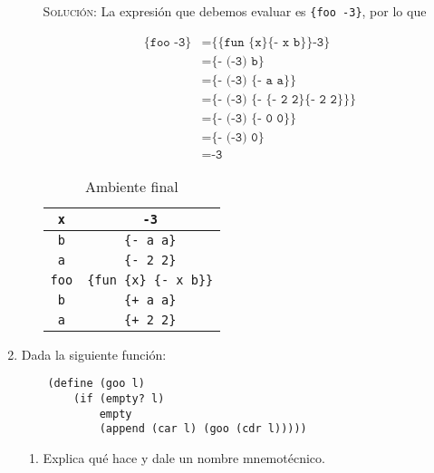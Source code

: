 \documentclass[letterpaper,11pt]{article}
\begin{document}
\begin{enumerate}
\begin{enumerate}
        \textsc{Solución:} La expresión que debemos evaluar es 
        \texttt{\{foo -3\}}, por lo que 
        \begin{table}[h]
            \parbox{.6\linewidth}{
            \centering
            \begin{align*}
                \texttt{\{foo -3\}}
                &= \texttt{\{\{fun \{x\} \{- x b\}\} -3\}} \\
                &= \texttt{\{- (-3) b\}} \\
                &= \texttt{\{- (-3) \{- a a\}\}} \\
                &= \texttt{\{- (-3) \{- \{- 2 2\} \{- 2 2\}\}\}} \\
                &= \texttt{\{- (-3) \{- 0 0\}\}} \\
                &= \texttt{\{- (-3) 0\}} \\
                &= \texttt{-3}
            \end{align*}
            }
            \hfill
            \parbox{.4\linewidth}{
            \centering
            \begin{tabular}{|c|c|}
                \hline
                \texttt{x} & \texttt{-3} \\
                \hline
                \texttt{b} & \texttt{\{- a a\}} \\
                \hline
                \texttt{a} & \texttt{\{- 2 2\}} \\
                \hline
                \texttt{foo} & \texttt{\{fun \{x\} \{- x b\}\}} \\
                \hline
                \texttt{b} & \texttt{\{+ a a\}} \\
                \hline
                \texttt{a} & \texttt{\{+ 2 2\}} \\
                \hline
            \end{tabular}
            \caption{Ambiente final}
            }
        \end{table}
    \end{enumerate}

    \item Dada la siguiente función:
    \begin{verbatim}
    (define (goo l)
        (if (empty? l)
            empty
            (append (car l) (goo (cdr l)))))
    \end{verbatim}

    \begin{enumerate}
        \item Explica qué hace y dale un nombre mnemotécnico.


\end{enumerate}
\end{enumerate}
\end{document}
